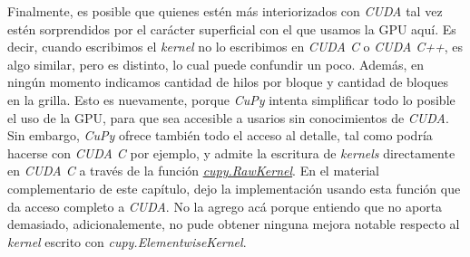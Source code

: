 Finalmente, es posible que quienes estén más interiorizados con \textit{CUDA} tal vez estén sorprendidos por el carácter superficial con el que 
usamos la GPU aquí. Es decir, cuando escribimos el \textit{kernel} no lo escribimos en \textit{CUDA C} o \textit{CUDA C++}, es algo similar, pero 
es distinto, lo cual puede confundir un poco. Además, en ningún momento indicamos cantidad de hilos por bloque y cantidad de bloques en la 
grilla. Esto es nuevamente, porque \textit{CuPy} intenta simplificar todo lo posible el uso de la GPU, para que sea accesible a usarios sin conocimientos 
de \textit{CUDA}. Sin embargo, \textit{CuPy} ofrece también todo el acceso al detalle, tal como podría hacerse con \textit{CUDA C} por ejemplo,
y admite la escritura de \textit{kernels} directamente en \textit{CUDA C} a través de la función 
\href{https://docs.cupy.dev/en/stable/user_guide/kernel.html}{\textit{cupy.RawKernel}}. En el material complementario de este capítulo, dejo la 
implementación usando esta función que da acceso completo a \textit{CUDA}. No la agrego acá porque entiendo que no aporta demasiado, adicionalemente, no 
pude obtener ninguna mejora notable respecto al \textit{kernel} escrito con \textit{cupy.ElementwiseKernel}.











